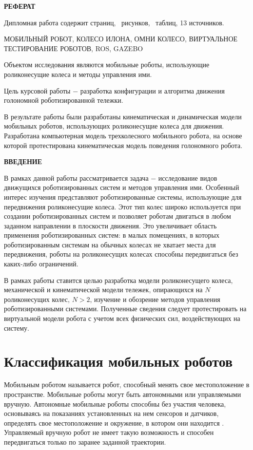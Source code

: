 \documentclass[oneside,final,14pt]{extreport}
\providecommand\totfig{}
\providecommand\tottab{}
\begin{document}
\begin{center}
\bfseries РЕФЕРАТ
\end{center}

Дипломная работа содержит \pageref{LastPage} страниц, \totfig\ рисунков, \tottab\ таблиц, 13 источников.

МОБИЛЬНЫЙ РОБОТ, КОЛЕСО ИЛОНА, ОМНИ КОЛЕСО, ВИРТУАЛЬНОЕ ТЕСТИРОВАНИЕ РОБОТОВ, ROS, GAZEBO

Объектом исследования являются мобильные роботы, использующие роликонесущие колеса и методы управления ими.

Цель курсовой работы $-$ разработка конфигурации и алгоритма движения голономной роботизированной тележки.

В результате работы были разработаны кинематическая и динамическая модели мобильных роботов, использующих роликонесущие колеса для движения. Разработана компьютерная модель трехколесного мобильного робота, на основе которой протестирована кинематическая модель поведения голономного робота.

\tableofcontents
\newpage
\begin{center}
\bfseries ВВЕДЕНИЕ
\end{center}

В рамках данной работы рассматривается задача $-$ исследование видов движущихся роботизированных систем и методов управления ими. Особенный интерес изучения представляют роботизированные системы, использующие для передвижения роликонесущие колеса. Этот тип колес широко используется при создании роботизированных систем и позволяет роботам двигаться в любом заданном направлении в плоскости движения. Это увеличивает область применения роботизированных систем: в малых помещениях, в которых роботизированным системам на обычных колесах не хватает места для передвижения, роботы на роликонесущих колесах способны передвигаться без каких-либо ограничений. 

В рамках работы ставится целью разработка модели роликонесущего колеса, механической и кинематической модели тележек, опирающихся на $N$ роликонесущих колес, $N>2$, изучение и обозрение методов управления роботизированными системами. Полученные сведения следует протестировать на виртуальной модели робота с учетом всех физических сил, воздействующих на систему.

\chapter{Классификация мобильных роботов}
Мобильным роботом называется робот, способный менять свое местоположение в пространстве. Мобильные роботы могут быть автономными или управляемыми вручную. Автономные мобильные роботы способны без участия человека, основываясь на показаниях установленных на нем сенсоров и датчиков, определять свое местоположение и окружение, в котором они находится \cite{Siegwart}. Управляемый вручную робот не имеет такую возможность и способен передвигаться только по заранее заданной траектории.
\end{document}
